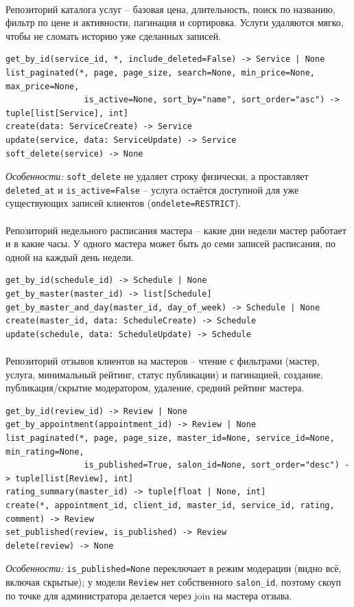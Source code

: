 \paragraph{}
Репозиторий каталога услуг -- базовая цена, длительность, поиск по
названию, фильтр по цене и активности, пагинация и сортировка. Услуги
удаляются мягко, чтобы не сломать историю уже сделанных записей.
\begin{verbatim}
get_by_id(service_id, *, include_deleted=False) -> Service | None
list_paginated(*, page, page_size, search=None, min_price=None, max_price=None,
                is_active=None, sort_by="name", sort_order="asc") -> tuple[list[Service], int]
create(data: ServiceCreate) -> Service
update(service, data: ServiceUpdate) -> Service
soft_delete(service) -> None
\end{verbatim}
\textit{Особенности:} \texttt{soft_delete} не удаляет строку физически,
а проставляет \texttt{deleted_at} и \texttt{is_active=False} -- услуга
остаётся доступной для уже существующих записей клиентов
(\texttt{ondelete=RESTRICT}).

\paragraph{}
Репозиторий недельного расписания мастера -- какие дни недели мастер
работает и в какие часы. У одного мастера может быть до семи записей
расписания, по одной на каждый день недели.
\begin{verbatim}
get_by_id(schedule_id) -> Schedule | None
get_by_master(master_id) -> list[Schedule]
get_by_master_and_day(master_id, day_of_week) -> Schedule | None
create(master_id, data: ScheduleCreate) -> Schedule
update(schedule, data: ScheduleUpdate) -> Schedule
\end{verbatim}

\paragraph{}
Репозиторий отзывов клиентов на мастеров -- чтение с фильтрами (мастер,
услуга, минимальный рейтинг, статус публикации) и пагинацией, создание,
публикация/скрытие модератором, удаление, средний рейтинг мастера.
\begin{verbatim}
get_by_id(review_id) -> Review | None
get_by_appointment(appointment_id) -> Review | None
list_paginated(*, page, page_size, master_id=None, service_id=None, min_rating=None,
                is_published=True, salon_id=None, sort_order="desc") -> tuple[list[Review], int]
rating_summary(master_id) -> tuple[float | None, int]
create(*, appointment_id, client_id, master_id, service_id, rating, comment) -> Review
set_published(review, is_published) -> Review
delete(review) -> None
\end{verbatim}
\textit{Особенности:} \texttt{is_published=None} переключает в режим
модерации (видно всё, включая скрытые); у модели \texttt{Review} нет
собственного \texttt{salon_id}, поэтому скоуп по точке для
администратора делается через join на мастера отзыва.

